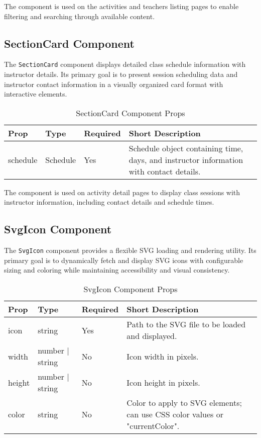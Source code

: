 The component is used on the activities and teachers listing pages to enable filtering and searching through available content.

\subsection{SectionCard Component}
The \texttt{SectionCard} component displays detailed class schedule information with instructor details. Its primary goal is to present session scheduling data and instructor contact information in a visually organized card format with interactive elements.

\begin{table}[H]
    \centering
    \setlength{\tabcolsep}{5pt}
    \renewcommand{\arraystretch}{1.2}
    \begin{tabular}{|p{2.2cm}|p{3.6cm}|p{1.5cm}|p{6cm}|}
        \hline
        \rowcolor{bluepoli!20}
        \textbf{Prop} & \textbf{Type} & \textbf{Required} & \textbf{Short Description} \\
        \hline
        schedule & Schedule & Yes & Schedule object containing time, days, and instructor information with contact details. \\
        \hline
    \end{tabular}
    \caption{SectionCard Component Props}
\end{table}

The component is used on activity detail pages to display class sessions with instructor information, including contact details and schedule times.

\subsection{SvgIcon Component}
The \texttt{SvgIcon} component provides a flexible SVG loading and rendering utility. Its primary goal is to dynamically fetch and display SVG icons with configurable sizing and coloring while maintaining accessibility and visual consistency.

\begin{table}[H]
    \centering
    \setlength{\tabcolsep}{5pt}
    \renewcommand{\arraystretch}{1.2}
    \begin{tabular}{|p{2.2cm}|p{3.6cm}|p{1.5cm}|p{6cm}|}
        \hline
        \rowcolor{bluepoli!20}
        \textbf{Prop} & \textbf{Type} & \textbf{Required} & \textbf{Short Description} \\
        \hline
        icon & string & Yes & Path to the SVG file to be loaded and displayed. \\
        \hline
        width & number | string & No & Icon width in pixels. \\
        \hline
        height & number | string & No & Icon height in pixels. \\
        \hline
        color & string & No & Color to apply to SVG elements; can use CSS color values or "currentColor". \\
        \hline
    \end{tabular}
    \caption{SvgIcon Component Props}
\end{table}

